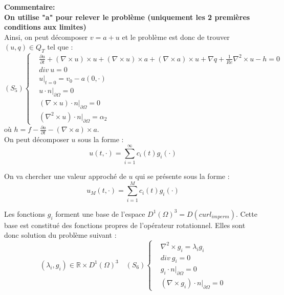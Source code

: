 \documentclass[a4paper,11pt]{article} %
\newcommand{\R}{{\mathbb{R}}}
\begin{document}
\textbf{Commentaire:\\
On utilise "a" pour relever le probl\`eme (uniquement les 2 premi\`eres conditions aux limites) }
\\

Ainsi, on peut d\'ecomposer $v=a+u$ et le probl\`eme est donc de trouver $(u,q)\in Q_T$ tel que :
\[
(S_5)\left\{
\begin{aligned}
&\frac{\partial u}{\partial t} + (\nabla\times u)\times u + (\nabla\times u)\times a +(\nabla\times a)\times u + \nabla q +\frac{1}{Re}\nabla^2\times u - h = 0\\
&div\ u = 0\\
&u\big\rvert_{t=0} = v_0 - a(0,\cdot)\\
&u\cdot n\big\rvert_{\partial\Omega} = 0\\
&(\nabla\times u)\cdot n\big\rvert_{\partial\Omega} = 0\\
&(\nabla^2\times u)\cdot n\big\rvert_{\partial\Omega} = \alpha_2
\end{aligned}
\right.
\]
o\`u $h=f-\frac{\partial a}{\partial t} - (\nabla\times a)\times a$.\\

On peut d\'ecomposer $u$ sous la forme :
\[
u(t,\cdot) = \sum_{i=1}^{\infty} c_i(t)g_i(\cdot)
\]

On va chercher une valeur approch\'e de $u$ qui se pr\'esente sous la forme :
\[
u_M(t,\cdot) = \sum_{i=1}^{M} c_i(t)g_i(\cdot)
\]

Les fonctions $g_i$ forment une base de l'espace $D^1(\Omega)^3 = D(curl_{imperm})$. Cette base est constitu\'e des fonctions propres de l'op\'erateur rotationnel. Elles sont donc solution du probl\`eme suivant :
\[
(\lambda_i,g_i)\in\R\times D^1(\Omega)^3\quad (S_6)\left\{
\begin{aligned}
&\nabla^2\times g_i = \lambda_i g_i\\
&div\ g_i = 0\\
&g_i\cdot n\big\rvert_{\partial\Omega} = 0\\
&(\nabla\times g_i)\cdot n\big\rvert_{\partial\Omega} = 0
\end{aligned}
\right.
\]
\end{document}
